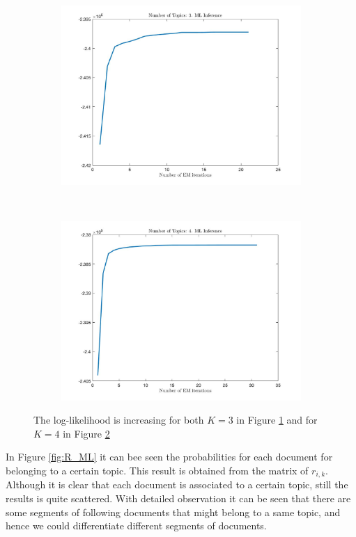 \documentclass[12pt]{article}
\begin{document}
\begin{figure}[h]
	\centering
	\begin{subfigure}{0.4\textwidth}
		\includegraphics[width=\textwidth]{images/ML/Q_ml_3_topics.jpg}
		\caption{}
		\label{fig:Q_ML_3}
	\end{subfigure}
	~	
	\begin{subfigure}{0.4\textwidth}
		\includegraphics[width=\textwidth]{images/ML/Q_ml_4_topics.jpg}
		\caption{}
		\label{fig:Q_ML_4}
	\end{subfigure}
	\caption{The log-likelihood is increasing for both $K=3$ in Figure \ref{fig:Q_ML_3} and for $K=4$ in Figure \ref{fig:Q_ML_4}}
	\label{fig:Q_ML}
\end{figure}
In Figure \ref{fig:R_ML} it can bee seen the probabilities for each document for belonging to a certain topic. This result is obtained from the matrix of $r_{i,k}$. Although it is clear that each document is associated to a certain topic, still the results is quite scattered. With detailed observation it can be seen that there are some segments of following documents that might belong to a same topic, and hence we could differentiate different segments of documents.
\end{document}
